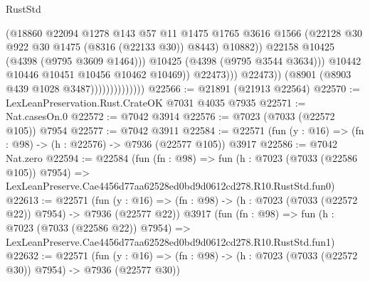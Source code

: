 \begin{lexlean}{RustStd}
\begin{coremodule}
                                                (@18860
                                                  @22094
                                                  @1278
                                                  @143
                                                  @57
                                                  @11
                                                  @1475
                                                  @1765
                                                  @3616
                                                  @1566
                                                  (@22128
                                                    @30
                                                    @922
                                                    @30
                                                    @1475
                                                    (@8316 (@22133 @30))
                                                    @8443)
                                                  @10882))
                                              @22158
                                              @10425
                                              (@4398 (@9795 @3609 @1464)))
                                            @10425
                                            (@4398 (@9795 @3544 @3634)))
                                          @10442
                                          @10446
                                          @10451
                                          @10456
                                          @10462
                                          @10469))
                                      @22473)))
                                @22473))
                            (@8901 (@8903 @439 @1028 @3487))))))))))))))
@22566 := @21891 (@21913 @22564)
@22570 := LexLeanPreservation.Rust.CrateOK @7031 @4035 @7935
@22571 := Nat.casesOn.{0}
@22572 := @7042 @3914
@22576 := @7023 (@7033 (@22572 @105)) @7954
@22577 := @7042 @3911
@22584 := @22571 (fun (y : @16) => (fn : @98) -> (h : @22576) -> @7936 (@22577 @105)) @3917
@22586 := @7042 Nat.zero
@22594 := @22584
    (fun (fn : @98) =>
    fun (h : @7023 (@7033 (@22586 @105)) @7954) =>
    LexLeanPreserve.Cae4456d77aa62528ed0bd9d0612cd278.R10.RustStd.fun0)
@22613 := @22571
    (fun (y : @16) => (fn : @98) -> (h : @7023 (@7033 (@22572 @22)) @7954) -> @7936 (@22577 @22))
    @3917
    (fun (fn : @98) =>
    fun (h : @7023 (@7033 (@22586 @22)) @7954) =>
    LexLeanPreserve.Cae4456d77aa62528ed0bd9d0612cd278.R10.RustStd.fun1)
@22632 := @22571
    (fun (y : @16) => (fn : @98) -> (h : @7023 (@7033 (@22572 @30)) @7954) -> @7936 (@22577 @30))

\end{coremodule}
\end{lexlean}

